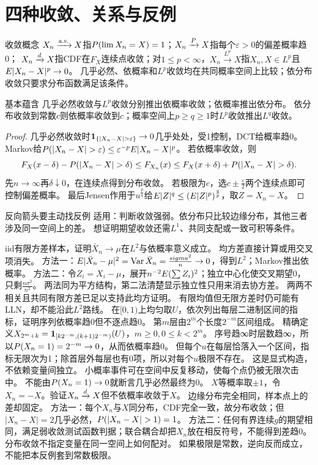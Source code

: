 \section{四种收敛、关系与反例}\label{sec:104}
\begin{definition}{收敛概念}
$X_n\xrightarrow{\mathrm{a.s.}} X$指$P(\lim X_n=X)=1$；$X_n\xrightarrow{P} X$指每个$\varepsilon>0$的偏差概率趋0；
$X_n\xrightarrow{d} X$指CDF在$F_X$连续点收敛；对$1\le p<\infty$，$X_n\xrightarrow{L^p}X$指$X_n,X\in L^p$且$E|X_n-X|^p\to0$。
几乎必然、依概率和$L^p$收敛均在共同概率空间上比较；依分布收敛只要求分布函数满足该条件。
\end{definition}
\begin{theorem}{基本蕴含}
几乎必然收敛与$L^p$收敛分别推出依概率收敛；依概率推出依分布。
依分布收敛到常数$c$则依概率收敛到$c$；概率空间上$p\ge q\ge1$时$L^p$收敛推出$L^q$收敛。
\end{theorem}
\begin{proof}
几乎必然收敛时$\ind_{\{|X_n-X|>\varepsilon\}}\to0$几乎处处，受1控制，DCT给概率趋0。
Markov给$\Pp(|X_n-X|>\varepsilon)\le\varepsilon^{-p}\E|X_n-X|^p$。
若依概率收敛，则
\[F_X(x-\delta)-\Pp(|X_n-X|>\delta)\le F_{X_n}(x)
\le F_X(x+\delta)+\Pp(|X_n-X|>\delta).\]
先$n\to\infty$再$\delta\downarrow0$，在连续点得到分布收敛。
若极限为$c$，选$c\pm\frac{\varepsilon}{2}$两个连续点即可控制偏差概率。
最后Jensen作用于$u^{\frac{p}{q}}$给$E|Z|^q\le(E|Z|^p)^{\frac{q}{p}}$，取$Z=X_n-X$。
\end{proof}
\begin{method}{反向箭头要主动找反例}
适用：判断收敛强弱。依分布只比较边缘分布，其他三者涉及同一空间上的差。
想证明期望收敛还需$L^1$、共同支配或一致可积等条件。
\end{method}
{iid有限方差样本，证明$\bar X_n\to\mu$在$L^2$与依概率意义成立。}
{均方差直接计算或用交叉项消失。}
{方法一：$E|\bar X_n-\mu|^2=\operatorname{Var}\bar X_n=\frac{sigma^2}{n}\to0$，得到$L^2$；Markov推出依概率。
方法二：令$Z_i=X_i-\mu$，展开$n^{-2}E(\sum Z_i)^2$；独立中心化使交叉期望0，只剩$\frac{n\sigma^2}{n^2}$。
两法同为平方结构，第二法清楚显示独立性只用来消去协方差。}
{两两不相关且共同有限方差已足以支持此均方证明。}
{有限均值但无限方差时仍可能有LLN，却不能沿此$L^2$路线。}
{在$[0,1)$上均匀取$U$，依次列出每层二进制区间的指标，证明序列依概率趋0但不逐点趋0。}
{第$m$层由$2^m$个长度$2^{-m}$区间组成。}
{精确定义$X_{2^m+k}=\mathbf1_{[k2^{-m},(k+1)2^{-m})}(U)$，$m\ge0,0\le k<2^m$。
序号趋∞时层数趋∞，所以$P(X_n=1)=2^{-m}\to0$，从而依概率趋0。
但每个$u$在每层恰落入一个区间，指标无限次为1；除首层外每层也有0项，所以对每个$u$极限不存在。
这是显式构造，不依赖变量间独立。}
{小概率事件可在空间中反复移动，使每个点仍被无限次击中。}
{不能由$P(X_n=1)\to0$就断言几乎必然最终为0。}
{$X$等概率取$\pm1$，令$X_n=-X$。验证$X_n\xrightarrow{d} X$但不依概率收敛于$X$。}
{边缘分布完全相同，样本点上的差却固定。}
{方法一：每个$X_n$与$X$同分布，CDF完全一致，故分布收敛；但$|X_n-X|=2$几乎必然，$\Pp(|X_n-X|>1)=1$。
方法二：任何有界连续$g$的期望相同，满足弱收敛测试函数判据；联合耦合却把$X_n$放在相反符号，不能得到差趋0。}
{分布收敛不指定变量在同一空间上如何配对。}
{如果极限是常数，逆向反而成立，不能把本反例套到常数极限。}

